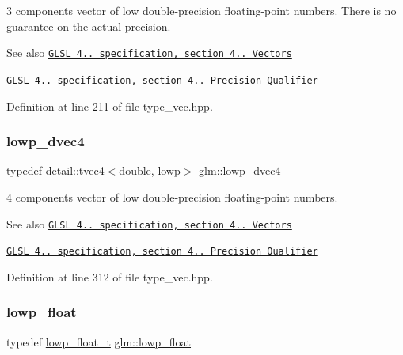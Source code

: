 3 components vector of low double-\/precision floating-\/point numbers. There is no guarantee on the actual precision.

\begin{DoxySeeAlso}{See also}
\href{http://www.opengl.org/registry/doc/GLSLangSpec.4.20.8.pdf}{\tt G\+L\+SL 4.. specification, section 4.. Vectors} 

\href{http://www.opengl.org/registry/doc/GLSLangSpec.4.20.8.pdf}{\tt G\+L\+SL 4.. specification, section 4.. Precision Qualifier} 
\end{DoxySeeAlso}


Definition at line 211 of file type\+\_\+vec.\+hpp.

\mbox{\label{group__core__precision_gad04432e5d5accf764e10c6674e5d0c96}} 
\subsubsection{\texorpdfstring{lowp\+\_\+dvec4}{lowp\_dvec4}}
{\footnotesize\ttfamily typedef \hyperlink{structglm_1_1detail_1_1tvec4}{detail\+::tvec4}$<$double, \hyperlink{namespaceglm_a0f04f086094c747d227af4425893f545ae161af3fc695e696ce3bf69f7332bc2d}{lowp}$>$ \hyperlink{group__core__precision_gad04432e5d5accf764e10c6674e5d0c96}{glm\+::lowp\+\_\+dvec4}}

4 components vector of low double-\/precision floating-\/point numbers.

\begin{DoxySeeAlso}{See also}
\href{http://www.opengl.org/registry/doc/GLSLangSpec.4.20.8.pdf}{\tt G\+L\+SL 4.. specification, section 4.. Vectors} 

\href{http://www.opengl.org/registry/doc/GLSLangSpec.4.20.8.pdf}{\tt G\+L\+SL 4.. specification, section 4.. Precision Qualifier} 
\end{DoxySeeAlso}


Definition at line 312 of file type\+\_\+vec.\+hpp.

\mbox{\label{group__core__precision_ga2887fbc729ac5c1c5caeb7cd57a7145c}} 
\subsubsection{\texorpdfstring{lowp\+\_\+float}{lowp\_float}}
{\footnotesize\ttfamily typedef \hyperlink{namespaceglm_a0a43b64238afac063f27ee7620205bf2}{lowp\+\_\+float\+\_\+t} \hyperlink{group__core__precision_ga2887fbc729ac5c1c5caeb7cd57a7145c}{glm\+::lowp\+\_\+float}}

